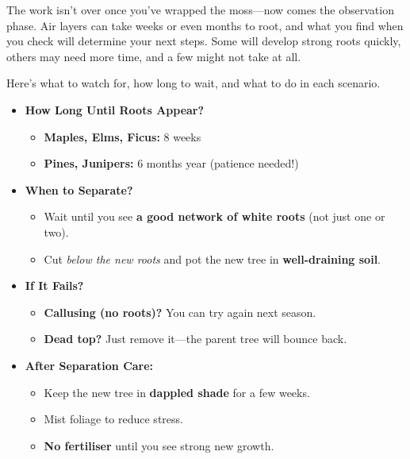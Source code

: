 \medskip
{}
\noindent
The work isn't over once you've wrapped the moss---now comes the observation phase. Air layers can take weeks or even months to root, and what you find when you check will determine your next steps. Some will develop strong roots quickly, others may need more time, and a few might not take at all.

Here's what to watch for, how long to wait, and what to do in each scenario.

\begin{itemize}
    \item \textbf{How Long Until Roots Appear?}
    \begin{itemize}
        \item \textbf{Maples, Elms, Ficus:} 8 weeks  

        \item \textbf{Pines, Junipers:} 6 months year (patience needed!)
    \end{itemize}

    \item \textbf{When to Separate?}
    \begin{itemize}
        \item Wait until you see \textbf{a good network of white roots} (not just one or two).

        \item Cut \textit{below the new roots} and pot the new tree in \textbf{well\--draining soil}.
    \end{itemize}

    \item \textbf{If It Fails?}
    \begin{itemize}
        \item \textbf{Callusing (no roots)?} You can try again next season. 

        \item \textbf{Dead top?} Just remove it---the parent tree will bounce back.
    \end{itemize}

    \item \textbf{After Separation Care:}
    \begin{itemize}
        \item Keep the new tree in \textbf{dappled shade} for a few weeks.

        \item Mist foliage to reduce stress.

        \item \textbf{No fertiliser} until you see strong new growth.
    \end{itemize}
\end{itemize}

